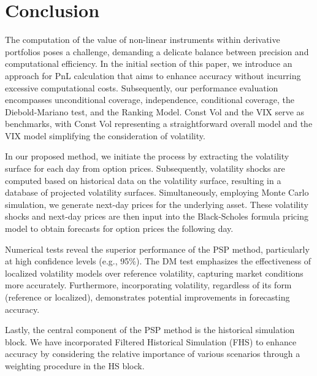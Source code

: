 \section{Conclusion}\label{conclusion}

The computation of the value of non-linear instruments within derivative portfolios poses a challenge, demanding a delicate balance between precision and computational efficiency. In the initial section of this paper, we introduce an approach for PnL calculation that aims to enhance accuracy without incurring excessive computational costs. Subsequently, our performance evaluation encompasses unconditional coverage, independence, conditional coverage, the Diebold-Mariano test, and the Ranking Model. Const Vol and the VIX serve as benchmarks, with Const Vol representing a straightforward overall model and the VIX model simplifying the consideration of volatility.

In our proposed method, we initiate the process by extracting the volatility surface for each day from option prices. Subsequently, volatility shocks are computed based on historical data on the volatility surface, resulting in a database of projected volatility surfaces. Simultaneously, employing Monte Carlo simulation, we generate next-day prices for the underlying asset. These volatility shocks and next-day prices are then input into the Black-Scholes formula pricing model to obtain forecasts for option prices the following day.

Numerical tests reveal the superior performance of the PSP method, particularly at high confidence levels (e.g., 95\%). The DM test emphasizes the effectiveness of localized volatility models over reference volatility, capturing market conditions more accurately. Furthermore, incorporating volatility, regardless of its form (reference or localized), demonstrates potential improvements in forecasting accuracy. 

Lastly, the central component of the PSP method is the historical simulation block. We have incorporated Filtered Historical Simulation (FHS) to enhance accuracy by considering the relative importance of various scenarios through a weighting procedure in the HS block.